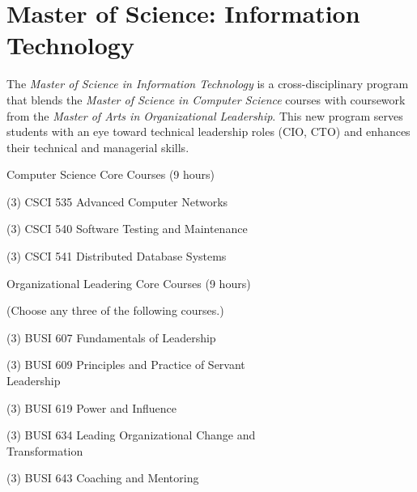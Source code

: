 %
\section*{Master of Science: Information Technology}

The \emph{Master of Science in Information Technology} is a cross-disciplinary program that blends the \emph{Master of Science in Computer Science} courses with coursework from the \emph{Master of Arts in Organizational Leadership}. This new program serves students with an eye toward technical leadership roles (CIO, CTO) and enhances their technical and managerial skills.

\begin{reqgroup}{Computer Science Core Courses (9 hours)}
\begin{checklist}
\begin{minipage}[t]{0.5\linewidth}
	\item (3) CSCI 535  Advanced Computer Networks
	\item (3) CSCI 540  Software Testing and Maintenance
	
\end{minipage}
\begin{minipage}[t]{0.5\linewidth}
	\item (3) CSCI 541  Distributed Database Systems
\end{minipage}
\end{checklist}
\end{reqgroup}
\vspace{0.25em}

\begin{reqgroup}{Organizational Leadering Core Courses (9 hours)}
	\begin{center}%
		(Choose any three of the following courses.)\vspace{-0.5em}%
	\end{center}%
	\begin{checklist}
	\begin{minipage}[t]{0.5\linewidth}
		\item (3) BUSI 607 Fundamentals of Leadership
		\item (3) BUSI 609 Principles and Practice of Servant \\Leadership
		\item (3) BUSI 619 Power and Influence
	\end{minipage}
	\begin{minipage}[t]{0.5\linewidth}
		\item (3) BUSI 634 Leading Organizational Change and \\Transformation
		\item (3) BUSI 643 Coaching and Mentoring
	\end{minipage}
	\end{checklist}
\end{reqgroup}
\vspace{0.25em}

